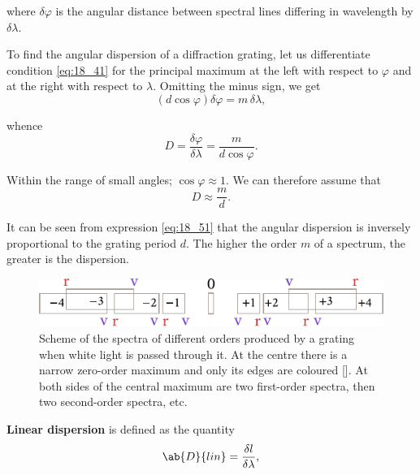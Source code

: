 \noindent
where $\delta{\varphi}$ is the angular distance between spectral lines differing in wavelength by $\delta{\lambda}$.

To find the angular dispersion of a diffraction grating, let us differentiate condition \eqref{eq:18_41} for the principal maximum at the
left with respect to $\varphi$ and at the right with respect to $\lambda$.
Omitting the minus sign, we get
\begin{equation*}
	(d\cos\varphi) \delta{\varphi} = m\, \delta{\lambda},
\end{equation*}

\noindent
whence
\begin{equation}\label{eq:18_50}
	D = \frac{\delta{\varphi}}{\delta{\lambda}} = \frac{m}{d\cos\varphi}.
\end{equation}

\noindent
Within the range of small angles; $\cos\varphi\approx 1$.
We can therefore assume that
\begin{equation}\label{eq:18_51}
	D \approx \frac{m}{d}.
\end{equation}

\noindent
It can be seen from expression \eqref{eq:18_51} that the angular dispersion is inversely proportional to the grating period $d$.
The higher the order $m$ of a spectrum, the greater is the dispersion.

\begin{figure}[!htb]
	\begin{center}
		\includegraphics[scale=1]{figures/ch_18/fig_18_35.pdf}
        \caption[]{Scheme of the spectra of different orders produced by a grating when white light is passed through it. At the centre there is a narrow zero-order maximum and only its edges are coloured []. At both sides of the central maximum are two first-order spectra, then two second-order spectra, etc.}
		\label{fig:18_35}
	\end{center}
	\vspace{-0.8cm}
\end{figure}

\textbf{Linear dispersion} is defined as the quantity
\begin{equation}\label{eq:18_52}
	\ab{D}{lin} = \frac{\delta{l}}{\delta{\lambda}},
\end{equation}

